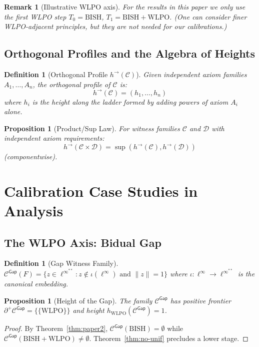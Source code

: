 \documentclass[11pt]{article}
\newtheorem{definition}[theorem]{Definition}
\newtheorem{proposition}[theorem]{Proposition}
\newtheorem{remark}[theorem]{Remark}
\newcommand{\WLPO}{\mathrm{WLPO}}
\newcommand{\BISH}{\mathrm{BISH}}
\newcommand{\linf}{\ell^\infty}
\newcommand{\Frontierpos}{\partial^{+}}
\begin{document}
\begin{remark}[Illustrative WLPO axis]
For the results in this paper we only use the first WLPO step $T_0=\BISH$, $T_1=\BISH+\WLPO$. (One can consider finer WLPO-adjacent principles, but they are not needed for our calibrations.)
\end{remark}

\subsection{Orthogonal Profiles and the Algebra of Heights}

\begin{definition}[Orthogonal Profile \(h^{\to}(\mathcal C)\)]
Given independent axiom families $A_1, \ldots, A_n$, the \emph{orthogonal profile} of $\mathcal{C}$ is:
\[
h^{\to}(\mathcal{C}) = (h_1, \ldots, h_n)
\]
where $h_i$ is the height along the ladder formed by adding powers of axiom $A_i$ alone.
\end{definition}

\begin{proposition}[Product/Sup Law]\label{prop:product-sup}
For witness families $\mathcal{C}$ and $\mathcal{D}$ with independent axiom requirements:
\[
h^{\to}(\mathcal{C} \times \mathcal{D}) = \sup(h^{\to}(\mathcal{C}), h^{\to}(\mathcal{D}))
\]
(componentwise).
\end{proposition}

\section{Calibration Case Studies in Analysis}

\subsection{The WLPO Axis: Bidual Gap}

\begin{definition}[Gap Witness Family]
$\mathcal{C}^{\mathsf{Gap}}(F) = \{z \in \linf^{**} : z \notin \iota(\linf) \text{ and } \|z\| = 1\}$ where $\iota: \linf \to \linf^{**}$ is the canonical embedding.
\end{definition}

\begin{proposition}[Height of the Gap]\label{prop:gap-height}
The family $\mathcal{C}^{\mathsf{Gap}}$ has positive frontier $\Frontierpos\mathcal{C}^{\mathsf{Gap}}=\{\{\WLPO\}\}$ and height $h_{\text{WLPO}}(\mathcal{C}^{\mathsf{Gap}})=1$.
\end{proposition}
\begin{proof}
By Theorem~\ref{thm:paper2}, $\mathcal{C}^{\mathsf{Gap}}(\BISH) = \emptyset$ while $\mathcal{C}^{\mathsf{Gap}}(\BISH+\WLPO)\neq\emptyset$. Theorem~\ref{thm:no-unif} precludes a lower stage.
\end{proof}
\end{document}
